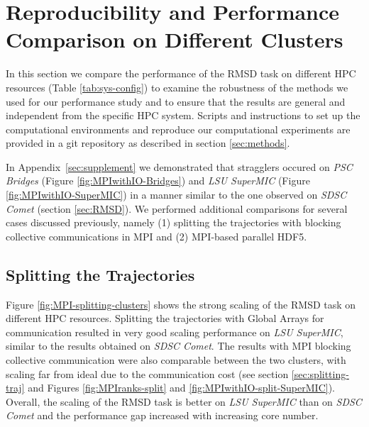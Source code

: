 
\section{Reproducibility and Performance Comparison on Different Clusters}
\label{sec:clusters}

In this section we compare the performance of the RMSD task on different HPC resources (Table \ref{tab:sys-config}) to examine the robustness of the methods we used for our performance study and to ensure that the results are general and independent from the specific HPC system.
Scripts and instructions to set up the computational environments and reproduce our computational experiments are provided in a git repository as described in section \ref{sec:methods}.

In Appendix~\ref{sec:supplement} we demonstrated that stragglers occured on \emph{PSC Bridges} (Figure \ref{fig:MPIwithIO-Bridges}) and \emph{LSU SuperMIC} (Figure \ref{fig:MPIwithIO-SuperMIC}) in a manner similar to the one observed on \emph{SDSC Comet} (section \ref{sec:RMSD}).
We performed additional comparisons for several cases discussed previously, namely (1) splitting the trajectories with blocking collective communications in MPI and (2) MPI-based parallel HDF5.

\subsection{Splitting the Trajectories}
Figure \ref{fig:MPI-splitting-clusters} shows the strong scaling of the RMSD task on different HPC resources.  
Splitting the trajectories with Global Arrays for communication resulted in very good scaling performance on \emph{LSU SuperMIC}, similar to the results obtained on \emph{SDSC Comet}.
The results with MPI blocking collective communication were also comparable between the two clusters, with scaling far from ideal due to the communication cost (see section \ref{sec:splitting-traj} and Figures \ref{fig:MPIranks-split} and \ref{fig:MPIwithIO-split-SuperMIC}). 
Overall, the scaling of the RMSD task is better on \emph{LSU SuperMIC} than on \emph{SDSC Comet} and the performance gap increased with increasing core number.

